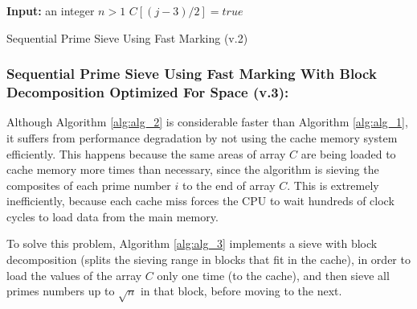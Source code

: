 \documentclass[runningheads,a4paper]{llncs}
\begin{document}
\begin{algorithm}[h]
        \begin{algorithmic}[1]
                \State \textbf{Input:} an integer $n > 1$
                \Statex
                                        \State $C[(j - 3) / 2] = true$
                                \EndFor
                        \EndIf
                \EndFor
                \Statex
        \end{algorithmic}
        \caption{Sequential Prime Sieve Using Fast Marking (v.2)}
        \label{alg:alg_2}
\end{algorithm}


\subsubsection{Sequential Prime Sieve Using Fast Marking With Block Decomposition Optimized For Space (v.3):}
\label{Sequential Prime Sieve Using Fast Marking With Block Decomposition Optimized For Space}

Although Algorithm \ref{alg:alg_2} is considerable faster than Algorithm \ref{alg:alg_1}, it suffers from performance degradation by not using the cache memory system efficiently. This happens because the same areas of array $C$ are being loaded to cache memory more times than necessary, since the algorithm is sieving the composites of each prime number $i$ to the end of array $C$. This is extremely inefficiently, because each cache miss forces the CPU to wait hundreds of clock cycles to load data from the main memory.

To solve this problem, Algorithm \ref{alg:alg_3} implements a sieve with block decomposition (splits the sieving range in blocks that fit in the cache), in order to load the values of the array $C$ only one time (to the cache), and then sieve all primes numbers up to $\sqrt{n}$ in that block, before moving to the next.
\end{document}
